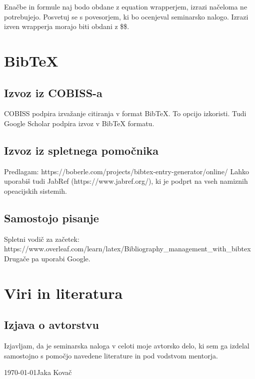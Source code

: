 \documentclass[12pt]{article}
\begin{document}
    Enačbe in formule naj bodo obdane z equation wrapperjem, izrazi načeloma ne potrebujejo.
    Posvetuj se s povesorjem, ki bo ocenjeval seminarsko nalogo. Izrazi izven wrapperja morajo biti obdani z \$\$.


\newpage
\section{BibTeX}
    \subsection{Izvoz iz COBISS-a}
    COBISS podpira izvažanje citiranja v format BibTeX. To opcijo izkoristi.
    Tudi Google Scholar podpira izvoz v BibTeX formatu.
    \subsection{Izvoz iz spletnega pomočnika}
    Predlagam: https://boberle.com/projects/bibtex-entry-generator/online/
    Lahko uporabiš tudi JabRef (https://www.jabref.org/), ki je podprt na vseh namiznih opeacijskih sistemih.
    \subsection{Samostojo pisanje}
    Spletni vodič za začetek: https://www.overleaf.com/learn/latex/Bibliography\_management\_with\_bibtex
    Drugače pa uporabi Google.




\newpage
\begingroup
\makeatletter
    \section{Viri in literatura}
    \nocite{*}
    \printbibliography[heading=none]
\makeatother
\endgroup
\newpage

\begin{samepage}
    \thispagestyle{empty}
    \section*{Izjava o avtorstvu}
    Izjavljam, da je seminarska naloga v celoti moje avtorsko delo, ki sem ga 
    izdelal samostojno s pomočjo navedene literature in pod vodstvom mentorja.

    \vfill
    
    \today \hfill Jaka Kovač
    
    \vspace{3 cm}
\end{samepage}
\end{document}
